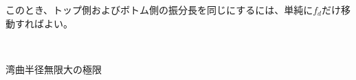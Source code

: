 このとき、トップ側およびボトム側の振分長を同じにするには、単純に$f_d$だけ移動すればよい。

~\vfill
\begin{Column}{湾曲半径無限大の極限\TBW}

\end{Column}
